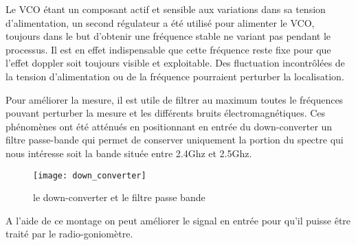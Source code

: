 Le VCO étant un composant actif et sensible aux variations dans sa tension d'alimentation, un second régulateur a été utilisé pour alimenter le VCO, toujours dans le but d’obtenir une fréquence stable ne variant pas pendant le processus. Il est en effet indispensable que cette fréquence reste fixe pour que l’effet doppler soit toujours visible et exploitable. Des fluctuation incontrôlées de la tension d'alimentation ou de la fréquence pourraient perturber la localisation.

Pour améliorer la mesure, il est utile de filtrer au maximum toutes le fréquences pouvant perturber la mesure et les différents bruits électromagnétiques. Ces phénomènes ont été atténués en positionnant en entrée du down-converter un filtre passe-bande qui permet de conserver uniquement la portion du spectre qui nous intéresse soit la bande située entre 2.4Ghz et 2.5Ghz.


\begin{figure}[h]
  \centering
  \texttt{[image: down\_converter]}
  \caption{le down-converter et le filtre passe bande}
  \label{fig:down}
\end{figure}

A l’aide de ce montage on peut améliorer le signal en entrée pour qu'il puisse être traité par le radio-goniomètre.

